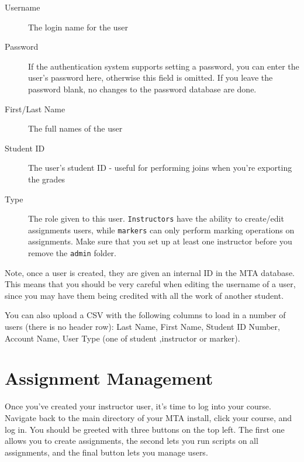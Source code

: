 \documentclass[11pt,letterpaper,oneside]{article}
\begin{document}
\begin{description}
  \item [Username] The login name for the user
  \item [Password] If the authentication system supports setting a password,  you can enter the user's password here,  otherwise this field is omitted. If you leave the password blank,  no changes to the password database are done.
  \item [First/Last Name] The full names of the user
  \item [Student ID] The user's student ID - useful for performing joins when you're exporting the grades
  \item [Type] The role given to this user. \texttt{Instructors} have the ability to create/edit assignments users,  while \texttt{markers} can only perform marking operations on assignments. Make sure that you set up at least one instructor before you remove the \texttt{admin} folder.
\end{description}

Note, once a user is created,  they are given an internal ID in the MTA database. This means that you should be very careful when editing the username of a user, since you may have them being credited with all the work of another student. 

You can also upload a CSV with the following columns to load in a number of users (there is no header row): Last Name, First Name, Student ID Number, Account Name, User Type (one of student ,instructor or marker).


\section{Assignment Management}

Once you've created your instructor user,  it's time to log into your course. Navigate back to the main directory of your MTA install,  click your course,  and log in. You should be greeted with three buttons on the top left. The first one allows you to create assignments,  the second lets you run scripts on all assignments,  and the final button lets you manage users. 
\end{document}
